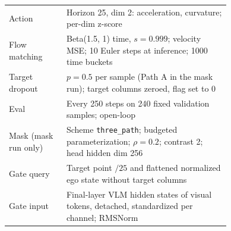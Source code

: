\begin{table}[!htb]
\begin{tabular}{@{}lp{0.74\linewidth}@{}}
Action & Horizon 25, dim 2: acceleration, curvature; per-dim z-score \\
Flow matching & Beta(1.5, 1) time, $s=0.999$; velocity MSE; 10 Euler steps at inference; 1000 time buckets \\
Target dropout & $p=0.5$ per sample (Path A in the mask run); target columns zeroed, flag set to 0 \\
Eval & Every 250 steps on 240 fixed validation samples; open-loop \\
\midrule
Mask (mask run only) & Scheme \texttt{three\_path}; budgeted parameterization; $\rho=0.2$; contrast 2; head hidden dim 256 \\
Gate query & Target point $/25$ and flattened normalized ego state without target columns \\
Gate input & Final-layer VLM hidden states of visual tokens, detached, standardized per channel; RMSNorm \\
\bottomrule
\end{tabular}
\end{table}

